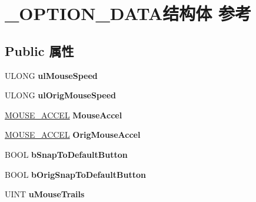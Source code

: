 \hypertarget{struct___o_p_t_i_o_n___d_a_t_a}{}\section{\+\_\+\+O\+P\+T\+I\+O\+N\+\_\+\+D\+A\+T\+A结构体 参考}
\label{struct___o_p_t_i_o_n___d_a_t_a}
\subsection*{Public 属性}
\begin{DoxyCompactItemize}
\item 
\mbox{\label{struct___o_p_t_i_o_n___d_a_t_a_aac3ccac39d63b17061b3297cbb20959c}} 
U\+L\+O\+NG {\bfseries ul\+Mouse\+Speed}
\item 
\mbox{\label{struct___o_p_t_i_o_n___d_a_t_a_aa5582bef390ce72b9bf6c044a94398a9}} 
U\+L\+O\+NG {\bfseries ul\+Orig\+Mouse\+Speed}
\item 
\mbox{\label{struct___o_p_t_i_o_n___d_a_t_a_aec63bcd8783ab9ead565b0c7c69fb50a}} 
\hyperlink{struct___m_o_u_s_e___a_c_c_e_l}{M\+O\+U\+S\+E\+\_\+\+A\+C\+C\+EL} {\bfseries Mouse\+Accel}
\item 
\mbox{\label{struct___o_p_t_i_o_n___d_a_t_a_a5d2cc0eb43896c5fc041b30b69a9ac93}} 
\hyperlink{struct___m_o_u_s_e___a_c_c_e_l}{M\+O\+U\+S\+E\+\_\+\+A\+C\+C\+EL} {\bfseries Orig\+Mouse\+Accel}
\item 
\mbox{\label{struct___o_p_t_i_o_n___d_a_t_a_a0320a7b330bce0488fdacedf170dce5c}} 
B\+O\+OL {\bfseries b\+Snap\+To\+Default\+Button}
\item 
\mbox{\label{struct___o_p_t_i_o_n___d_a_t_a_a2462ab1e9eaa347cd859989a1b18eebd}} 
B\+O\+OL {\bfseries b\+Orig\+Snap\+To\+Default\+Button}
\item 
\mbox{\label{struct___o_p_t_i_o_n___d_a_t_a_a39d2571cbb22d01c049db8bc9e91c9a0}} 
U\+I\+NT {\bfseries u\+Mouse\+Trails}
\item 
\mbox{\label{struct___o_p_t_i_o_n___d_a_t_a_a50f2291964a0a4ee334da7d8eabdd66a}} 

\end{DoxyCompactItemize}
